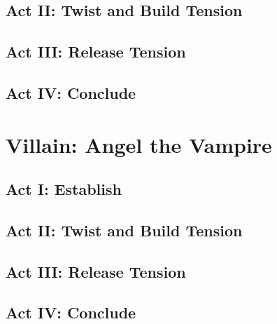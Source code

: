 \documentclass[]{article}
\begin{document}
\subsection*{Act II: Twist and Build Tension}
\subsection*{Act III: Release Tension}
\subsection*{Act IV: Conclude}

\section{Villain: Angel the Vampire}
\subsection*{Act I: Establish}
\subsection*{Act II: Twist and Build Tension}
\subsection*{Act III: Release Tension}
\subsection*{Act IV: Conclude}
\end{document}
